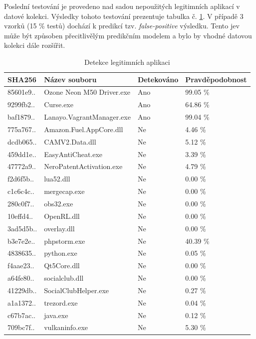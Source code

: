 Poslední testování je provedeno nad sadou nepoužitých legitimních aplikací v datové kolekci. Výsledky tohoto testování prezentuje tabulka č. \ref{table:software_check}. V případě 3 vzorků (15 \% testů) dochází k predikcí tzv. \emph{false-positive} výsledku. Tento jev může být způsoben přecitlivělým predikčním modelem a bylo by vhodné datovou kolekci dále rozšířit.

\begin{table}[H]
    \centering
	\begin{tabular}{|l|l|l|l|}
		\hline
		SHA256    & Název souboru   			   & Detekováno & Pravděpodobnost \\ \hline
		\hline
		85601e9.. & Ozone Neon M50 Driver.exe      & Ano  & 99.05 \% \\ \hline
		9299fb2.. & Curse.exe                      & Ano  & 64.86 \% \\ \hline
		baf1879.. & Lanayo.VagrantManager.exe      & Ano  & 99.04 \% \\ \hline
		775a767.. & Amazon.Fuel.AppCore.dll        & Ne & 4.46 \%  \\ \hline
		dcdb065.. & CAMV2.Data.dll                 & Ne & 5.12 \%  \\ \hline
		459dd1e.. & EasyAntiCheat.exe              & Ne & 3.39 \%  \\ \hline
		47772a9.. & NeroPatentActivation.exe       & Ne & 4.79 \%  \\ \hline
		f2d6f5b.. & lua52.dll                      & Ne & 0.00 \%  \\ \hline
		c1c6c4c.. & mergecap.exe                   & Ne & 0.00 \%  \\ \hline
		280c0f7.. & obs32.exe                      & Ne & 0.00 \%  \\ \hline
		10effd4.. & OpenRL.dll                     & Ne & 0.00 \%  \\ \hline
		3ad5d5b.. & overlay.dll                    & Ne & 0.00 \%  \\ \hline
		b3e7e2e.. & phpstorm.exe                   & Ne & 40.39 \% \\ \hline
		4838635.. & python.exe                     & Ne & 0.05 \%  \\ \hline
		f4aae23.. & Qt5Core.dll                    & Ne & 0.00 \%  \\ \hline
		a64fe80.. & socialclub.dll                 & Ne & 0.00 \%  \\ \hline
		41229db.. & SocialClubHelper.exe           & Ne & 0.27 \%  \\ \hline
		a1a1372.. & trezord.exe                    & Ne & 0.04 \%  \\ \hline
		c67b7ac.. & java.exe                       & Ne & 0.12 \%  \\ \hline
		709bc7f.. & vulkaninfo.exe                 & Ne & 5.30 \%  \\ \hline
	\end{tabular}
    \caption{Detekce legitimních aplikaci}
    \label{table:software_check}
\end{table}


